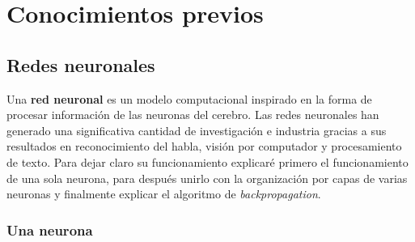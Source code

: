 \documentclass[12,twoside]{TFG-GM}
\theoremstyle{definition}
\theoremstyle{remark}
\begin{document}

\maketitle

\section{Conocimientos previos}
%
%


\subsection{Redes neuronales}
Una \textbf{red neuronal} es un modelo computacional inspirado en la forma de procesar información de las neuronas del cerebro. Las redes neuronales han generado una significativa cantidad de investigación e industria gracias a sus resultados en reconocimiento del habla, visión por computador y procesamiento de texto. Para dejar claro su funcionamiento explicaré primero el funcionamiento de una sola neurona, para después unirlo con la organización por capas de varias neuronas y finalmente explicar el algoritmo de \textit{backpropagation}. 

\subsubsection{Una neurona}
\end{document}
